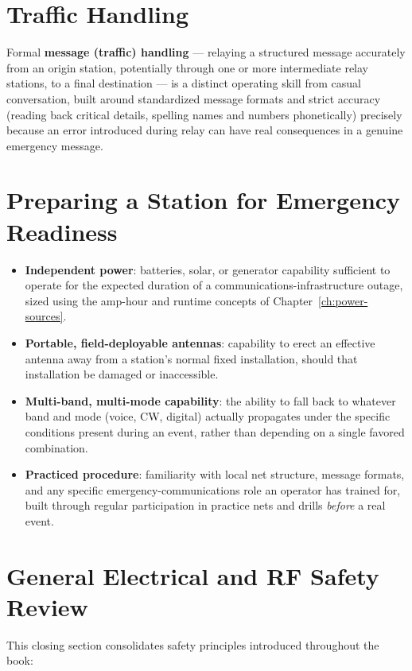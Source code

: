 \section{Traffic Handling}

Formal \textbf{message (traffic) handling} --- relaying a structured
message accurately from an origin station, potentially through one or
more intermediate relay stations, to a final destination --- is a
distinct operating skill from casual conversation, built around
standardized message formats and strict accuracy (reading back critical
details, spelling names and numbers phonetically) precisely because an
error introduced during relay can have real consequences in a
genuine emergency message.

\section{Preparing a Station for Emergency Readiness}

\begin{itemize}
\item \textbf{Independent power}: batteries, solar, or generator
capability sufficient to operate for the expected duration of a
communications-infrastructure outage, sized using the amp-hour and
runtime concepts of Chapter~\ref{ch:power-sources}.
\item \textbf{Portable, field-deployable antennas}: capability to erect
an effective antenna away from a station's normal fixed installation,
should that installation be damaged or inaccessible.
\item \textbf{Multi-band, multi-mode capability}: the ability to fall
back to whatever band and mode (voice, CW, digital) actually propagates
under the specific conditions present during an event, rather than
depending on a single favored combination.
\item \textbf{Practiced procedure}: familiarity with local net
structure, message formats, and any specific emergency-communications
role an operator has trained for, built through regular participation
in practice nets and drills \emph{before} a real event.
\end{itemize}

\section{General Electrical and RF Safety Review}

This closing section consolidates safety principles introduced
throughout the book:

